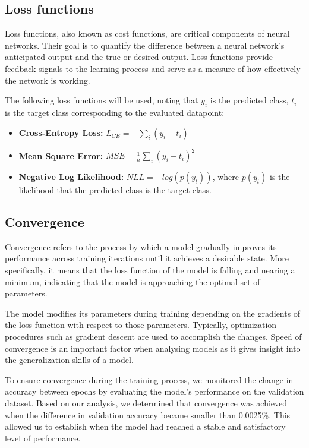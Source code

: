 \documentclass[a4paper,twoside,10pt]{article}
\begin{document}
\subsection{Loss functions}
Loss functions, also known as cost functions, are critical components of neural networks. Their goal is to quantify the difference between a neural network's anticipated output and the true or desired output. Loss functions provide feedback signals to the learning process and serve as a measure of how effectively the network is working.

The following loss functions will be used, noting that $y_i$ is the predicted class, $t_i$ is the target class corresponding to the evaluated datapoint:
\begin{itemize}
	\item \textbf{Cross-Entropy Loss: } $L_{CE} = -\sum_i (y_i - t_i)$
	\item \textbf{Mean Square Error: } $MSE = \frac{1}{n}\sum_i (y_i - t_i)^2$
	\item \textbf{Negative Log Likelihood: } $NLL = -log(p(y_t))$, where $p(y_t)$ is the likelihood that the predicted class is the target class.
\end{itemize}

\subsection{Convergence}
Convergence refers to the process by which a model gradually improves its performance across training iterations until it achieves a desirable state. More specifically, it means that the loss function of the model is falling and nearing a minimum, indicating that the model is approaching the optimal set of parameters.

The model modifies its parameters during training depending on the gradients of the loss function with respect to those parameters. Typically, optimization procedures such as gradient descent are used to accomplish the changes. Speed of convergence is an important factor when analysing models as it gives insight into the generalization skills of a model.

To ensure convergence during the training process, we monitored the change in accuracy between epochs by evaluating the model's performance on the validation dataset. Based on our analysis, we determined that convergence was achieved when the difference in validation accuracy became smaller than 0.0025\%. This allowed us to establish when the model had reached a stable and satisfactory level of performance.
\end{document}
